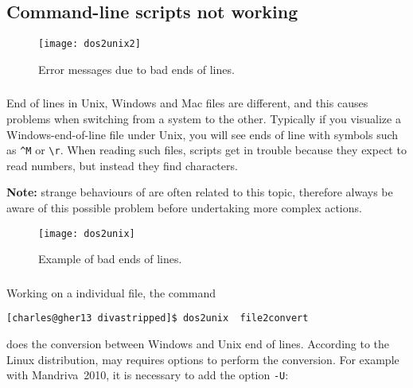 \subsection{Command-line scripts not working}


\begin{figure}[htpb]
\centering
\texttt{[image: dos2unix2]}
\caption{Error messages due to bad ends of lines. \label{fig:error_dos2unix}}
\end{figure}

\subsubsection{\question}

End of lines in Unix,  Windows and Mac files are different, and this causes problems when switching from a system to the other. Typically if you visualize a Windows-end-of-line file under Unix, you will see ends of line with symbols such as \verb|^M| or \verb|\r|. When reading such files, scripts get in trouble because they expect to read numbers, but instead they find characters.

\textbf{Note:} strange behaviours of \diva are often related to this topic, therefore always be aware of this possible problem before undertaking more complex actions.

\begin{figure}[htpb]
\centering
\texttt{[image: dos2unix]}
\caption{Example of bad ends of lines.\label{fig:error_dos2unix2}}
\end{figure}


\subsubsection{\answer}

Working on a individual file, the command\\

\begin{lstlisting}[style=Bash]
[charles@gher13 divastripped]$ dos2unix  file2convert
\end{lstlisting}
does the conversion between Windows and Unix end of lines. According to the Linux distribution,  may requires options to perform the conversion. For example with Mandriva~2010, it is necessary to add the option \texttt{-U}:

